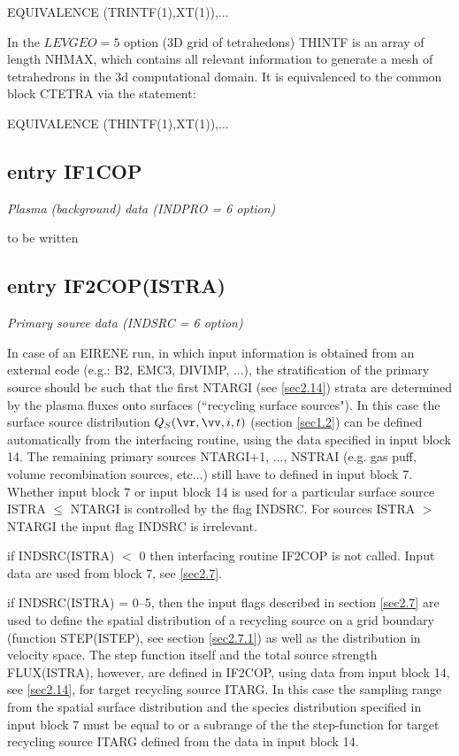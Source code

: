 EQUIVALENCE (TRINTF(1),XT(1)),...

In the $LEVGEO=5$ option (3D grid of tetrahedons) THINTF is an array of length NHMAX, which
contains all relevant information to generate a mesh of
tetrahedrons in the 3d computational domain. It is equivalenced to
the common block CTETRA via the statement:

EQUIVALENCE (THINTF(1),XT(1)),...

\subsection{entry IF1COP} \label{sec4.1.1}
{\sl Plasma (background) data (INDPRO = 6 option)}


\medskip


to be written
\subsection{entry IF2COP(ISTRA)} \label{sec4.1.2}
{\sl Primary source data (INDSRC = 6 option)}

\medskip
In case of an EIRENE run, in which input information is obtained
from an external code (e.g.: B2, EMC3, DIVIMP, ...), the
stratification of the primary source should be such that the first
NTARGI (see \ref{sec2.14}) strata are determined by the plasma
fluxes onto surfaces (``recycling surface sources"). In this case
the surface source distribution $Q_S(\vr,\vv,i,t)$ (section \ref{sec1.2}) can be defined automatically from the interfacing
routine, using the data specified in input block 14. The remaining
primary sources NTARGI+1, ..., NSTRAI (e.g. gas puff, volume
recombination sources, etc...) still have to defined in input
block 7.  Whether input block 7 or input block 14 is used for
a particular surface source ISTRA $\le$ NTARGI is controlled by
the flag INDSRC.  For sources ISTRA $>$ NTARGI the input flag INDSRC  is irrelevant.

if INDSRC(ISTRA) $<$ 0 then interfacing routine IF2COP is not called.
Input data are used from block 7, see \ref{sec2.7}.

\medskip

if INDSRC(ISTRA) = 0--5, then the input flags described in section
\ref{sec2.7} are used to define the spatial distribution of a
recycling source on a grid boundary (function STEP(ISTEP), see
section \ref{sec2.7.1}) as well as the distribution in velocity
space. The step function itself and the total source strength
FLUX(ISTRA), however, are defined in IF2COP, using data from input
block 14, see \ref{sec2.14}, for target recycling source ITARG. In
this case the sampling range from the spatial surface distribution
and the species distribution specified in input block 7 must be
equal to or a subrange of the the step-function for target
recycling source ITARG defined from the data in input block 14.

